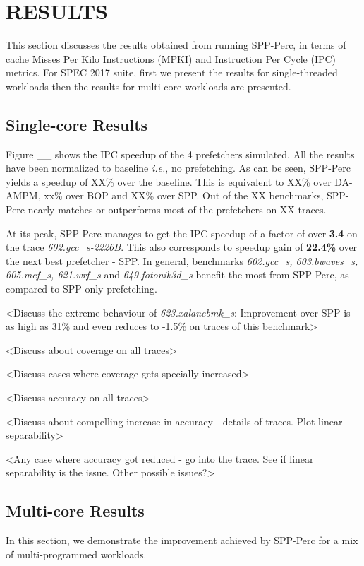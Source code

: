 
\section{RESULTS}
This section discusses the results obtained from running SPP-Perc, in
terms of cache Misses Per Kilo Instructions (MPKI) and Instruction Per
Cycle (IPC) metrics.  For SPEC 2017 suite, first we present the
results for single-threaded workloads then the results for multi-core
workloads are presented.

\subsection{Single-core Results}
Figure \_\_ shows the IPC speedup of the 4 prefetchers simulated.  All
the results have been normalized to baseline \textit{i.e.}, no
prefetching.  As can be seen, SPP-Perc yields a speedup of XX\% over
the baseline.  This is equivalent to XX\% over DA-AMPM, xx\% over BOP
and XX\% over SPP.  Out of the XX benchmarks, SPP-Perc nearly matches
or outperforms most of the prefetchers on XX traces.

At its peak, SPP-Perc manages to get the IPC speedup of a factor of
over \textbf{3.4} on the trace \textit{602.gcc\_s-2226B}.  This also
corresponds to speedup gain of \textbf{22.4\%} over the next best
prefetcher - SPP.  In general, benchmarks \textit{602.gcc\_s,
  603.bwaves\_s, 605.mcf\_s, 621.wrf\_s} and \textit{649.fotonik3d\_s}
benefit the most from SPP-Perc, as compared to SPP only prefetching.

<Discuss the extreme behaviour of \textit{623.xalancbmk\_s}:
Improvement over SPP is as high as 31\% and even reduces to -1.5\% on
traces of this benchmark>

<Discuss about coverage on all traces>

<Discuss cases where coverage gets specially increased>

<Discuss accuracy on all traces>

<Discuss about compelling increase in accuracy - details of
traces. Plot linear separability>

<Any case where accuracy got reduced - go into the trace. See if
linear separability is the issue. Other possible issues?>


\subsection{Multi-core Results}
In this section, we demonstrate the improvement achieved by SPP-Perc
for a mix of multi-programmed workloads.

